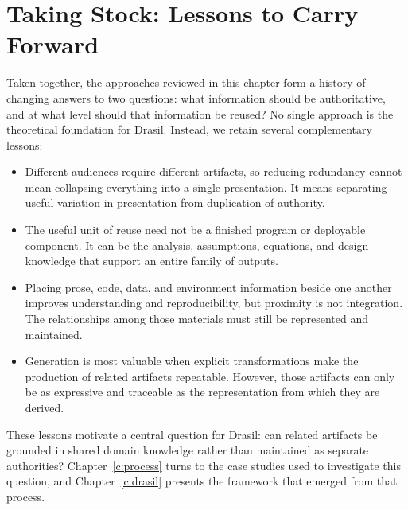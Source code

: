 \section{Taking Stock: Lessons to Carry Forward}

Taken together, the approaches reviewed in this chapter form a history of
changing answers to two questions: what information should be authoritative,
and at what level should that information be reused? No single approach is the
theoretical foundation for Drasil. Instead, we retain several complementary
lessons:

\begin{itemize}
    \item Different audiences require different artifacts, so reducing
    redundancy cannot mean collapsing everything into a single presentation.
    It means separating useful variation in presentation from duplication of
    authority.
    \item The useful unit of reuse need not be a finished program or deployable
    component. It can be the analysis, assumptions, equations, and design
    knowledge that support an entire family of outputs.
    \item Placing prose, code, data, and environment information beside one
    another improves understanding and reproducibility, but proximity is not
    integration. The relationships among those materials must still be
    represented and maintained.
    \item Generation is most valuable when explicit transformations make the
    production of related artifacts repeatable. However, those artifacts can
    only be as expressive and traceable as the representation from which they
    are derived.
\end{itemize}

These lessons motivate a central question for Drasil: can related artifacts be
grounded in shared domain knowledge rather than maintained as separate
authorities? Chapter~\ref{c:process} turns to the case studies used to
investigate this question, and Chapter~\ref{c:drasil} presents the framework
that emerged from that process.
